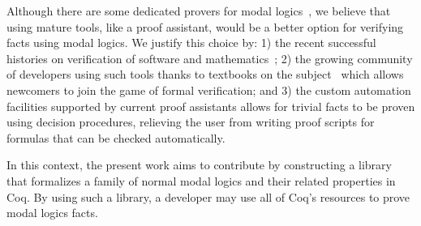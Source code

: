 \documentclass[3p,times]{elsarticle}
\begin{document}
Although there are some dedicated provers for modal logics~\cite{Gleissner17,Mora11},
we believe that using mature tools, like a proof assistant, would be a better option for
verifying facts using modal logics. We justify this choice by: 1) the recent
successful histories on verification of software and
mathematics~\cite{Leroy09,Klein10,Gonthier13,Gonthier08}; 2) the growing
community of developers using such tools thanks to
textbooks on the subject~\cite{Nipkow14,Bertot10,Chlipala13} which allows
newcomers to join the game of formal verification; and 3) the custom automation
facilities supported by current proof assistants allows for trivial facts to
be proven using decision procedures, relieving the user from writing proof
scripts for formulas that can be checked automatically.

In this context, the present work aims to contribute by constructing a library
that formalizes a family of normal modal logics and their related properties in Coq.
By using such a library, a developer may use all of Coq's resources to prove
modal logics facts.



\end{document}
